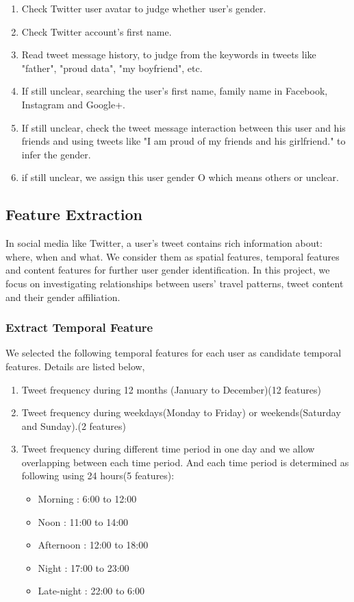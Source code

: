 \documentclass{article}
\begin{document}
\begin{enumerate}
\item Check Twitter user avatar to judge whether user's gender.
\item Check Twitter account's first name.
\item Read tweet message history, to judge from the keywords in tweets like "father", "proud data", "my boyfriend", etc.
\item If still unclear, searching the user's first name, family name in Facebook, Instagram and Google+.
\item If still unclear, check the tweet message interaction between this user and his friends and using tweets like "I am proud of my friends and his girlfriend." to infer the gender.
\item if still unclear, we assign this user gender O which means others or unclear.
\end{enumerate}



\subsection{Feature Extraction}

In social media like Twitter, a user's tweet contains rich information about: where, when and what. We consider them as spatial features, temporal features and content features for further user gender identification. In this project, we focus on investigating relationships between users' travel patterns, tweet content and their gender affiliation. 

\subsubsection{Extract Temporal Feature}

We selected the following temporal features for each user  as candidate temporal features. Details are listed below,

\begin{enumerate}
\item Tweet frequency during 12 months (January to December)(12 features)
\item Tweet frequency during weekdays(Monday to Friday) or weekends(Saturday and Sunday).(2 features) 
\item Tweet frequency during different time period in one day and we allow overlapping between each time period. And each time period is determined as following using 24 hours(5 features): 
\begin{itemize}
\item Morning : 6:00 to 12:00
\item Noon : 11:00 to 14:00
\item Afternoon :  12:00 to 18:00 
\item Night :  17:00 to 23:00
\item Late-night :  22:00 to 6:00
\end{itemize}
\end{enumerate}
\end{document}
